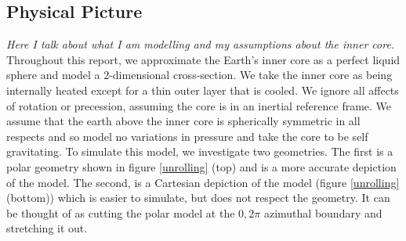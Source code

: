 \documentclass{article}
\begin{document}


\newpage
\subsection*{Physical Picture}
{\it{Here I talk about what I am modelling and my assumptions about the inner core.}}
\vspace{0.3cm}
\newline
Throughout this report, we approximate the Earth's inner core as a perfect liquid sphere and model a 
2-dimensional cross-section. We take the inner core as being internally heated except for a thin 
outer layer that is cooled. We ignore all affects of rotation or precession, assuming the core is 
in an inertial reference frame. We assume that the earth above the inner core is spherically 
symmetric in all respects and so model no variations in pressure and take the core to be self gravitating.
\newline
To simulate this model, we investigate two geometries. The first is a polar geometry shown in figure \ref{unrolling} (top) and is a more accurate depiction of the model. The second, is a Cartesian depiction of the model (figure \ref{unrolling} (bottom)) which is easier to simulate, but does not respect the geometry. It can be thought of as cutting the polar model at the $0,2\pi$ azimuthal boundary and stretching it out. 
\end{document}
